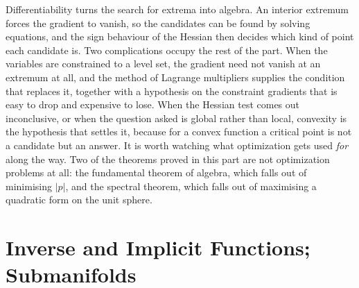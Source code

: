 \documentclass{report}
\theoremstyle{purplethm}
\theoremstyle{purplethm}
\theoremstyle{defthm}
\theoremstyle{examplethm}
\theoremstyle{questionthm}
\theoremstyle{remarkthm}
\theoremstyle{asidethm}
\theoremstyle{importantremarkthm}
\theoremstyle{remarkthm}
\theoremstyle{ainotethm}
\theoremstyle{purplethm}
\begin{document}
Differentiability turns the search for extrema into algebra. An interior extremum forces the
gradient to vanish, so the candidates can be found by solving equations, and the sign behaviour of
the Hessian then decides which kind of point each candidate is. Two complications occupy the rest
of the part. When the variables are constrained to a level set, the gradient need not vanish at an
extremum at all, and the method of Lagrange multipliers supplies the condition that replaces it,
together with a hypothesis on the constraint gradients that is easy to drop and expensive to lose.
When the Hessian test comes out inconclusive, or when the question asked is global rather than
local, convexity is the hypothesis that settles it, because for a convex function a critical point
is not a candidate but an answer. It is worth watching what optimization gets used \emph{for}
along the way. Two of the theorems proved in this part are not optimization problems at all: the
fundamental theorem of algebra, which falls out of minimising $\lvert p\rvert$, and the spectral
theorem, which falls out of maximising a quadratic form on the unit sphere.





\part{Inverse and Implicit Functions; Submanifolds}
\end{document}
